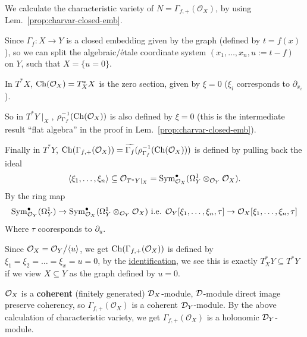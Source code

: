 \begin{remark}
    We calculate the characteristic variety of $N = \Gamma_{f,+}(\mathcal{O}_X)$, by using Lem.~\ref{prop:charvar-closed-emb}.

    Since $\Gamma_f: X \to Y$ is a closed embedding given by the graph (defined by $t = f(x)$),
    so we can split the algebraic/étale coordinate system $(x_1, \dots , x_n, u:= t - f)$ on $Y$, such that $X = \{ u = 0 \}$.

    In $T^\ast X$, $\operatorname{Ch}(\mathcal{O}_X) = T^\ast_X X$ is the zero section, given by $\xi = 0$ ($\xi_i$ corresponds to $\partial_{x_i}$).

    So in $T^\ast Y\mid_X$, $\rho^{-1}_{\Gamma_f}(\operatorname{Ch}(\mathcal{O}_X))$ is also defined by $\xi = 0$
    (this is the intermediate result ``flat algebra'' in the proof in Lem.~\ref{prop:charvar-closed-emb}).

    Finally in $T^\ast Y$, $\operatorname{Ch}(\Gamma_{f,+}(\mathcal{O}_X)) = \widetilde{\Gamma_f}(\rho^{-1}_{\Gamma_f}(\operatorname{Ch}(\mathcal{O}_X)))$ is defined by pulling back the ideal
    \[
        \langle \xi_1, \dots, \xi_n \rangle \subseteq \mathcal{O}_{T^\ast Y\mid_X} = \operatorname{Sym}^\bullet_{\mathcal{O}_X}(\Omega^1_Y \otimes_{\mathcal{O}_Y} \mathcal{O}_X).
    \]
    By the ring map
    \[
        \operatorname{Sym}^\bullet_{\mathcal{O}_Y}(\Omega^1_Y)\to \operatorname{Sym}^\bullet_{\mathcal{O}_X}(\Omega^1_Y \otimes_{\mathcal{O}_Y} \mathcal{O}_X) \text{ i.e. } \mathcal{O}_Y[\xi_1, \dots, \xi_n, \tau] \to \mathcal{O}_X[\xi_1, \dots, \xi_n, \tau]
    \]
    Where $\tau$ cooresponds to $\partial_u$.

    Since $\mathcal{O}_X = \mathcal{O}_Y\big/\langle u \rangle$, we get $\operatorname{Ch}(\Gamma_{f,+}(\mathcal{O}_X))$ is defined by $\xi_1 = \xi_2 = \dots =\xi_x = u = 0$,
    by the \hyperref[prop:conormal_bundle_in_local_coordinate]{identification}, we see this is exactly $T^*_X Y \subseteq T^\ast Y$
    if we view $X\subseteq Y$ as the graph defined by $u=0$.

    \bigskip

    $\mathcal{O}_X$ is a \textbf{coherent} (finitely generated) $\mathcal{D}_X$-module,
    $\mathcal{D}$-module direct image preserve coherency, so $\Gamma_{f,+}(\mathcal{O}_X)$ is a coherent $\mathcal{D}_Y$-module.
    By the above calculation of characteristic variety, we get $\Gamma_{f,+}(\mathcal{O}_X)$ is a holonomic $\mathcal{D}_Y$-module.


\end{remark}
